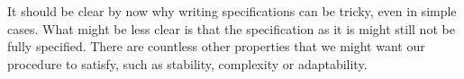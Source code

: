 It should be clear by now why writing specifications can be tricky, even in
simple cases. What might be less clear is that the specification as it is might
still not be fully specified. There are countless other properties that we might
want our procedure to satisfy, such as stability, complexity or adaptability.







